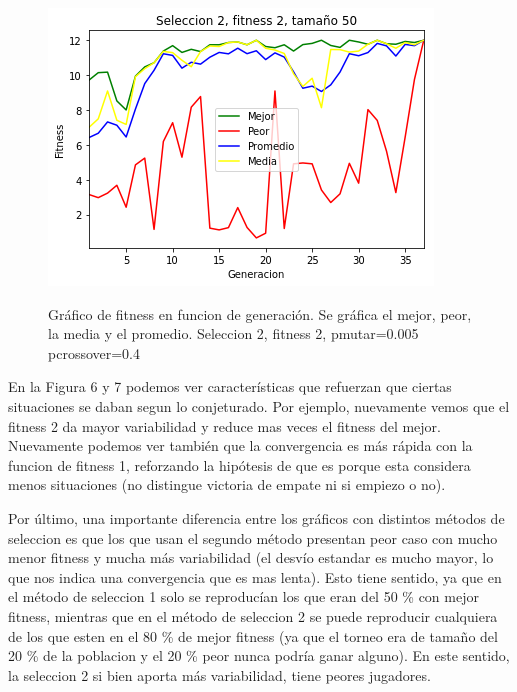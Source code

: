 \documentclass[A4paper,oneside,fleqn,11pt]{article}
\theoremstyle{definition}
\begin{document}
\begin{figure}[H]
	\captionsetup[subfigure]{position=b}
	\centering
		{\includegraphics[width=0.3\linewidth]{s2f2t50.png}}
	\caption{Gráfico de fitness en funcion de generación. Se gráfica el mejor, peor, la media y el promedio. Seleccion 2, fitness 2, pmutar=0.005 pcrossover=0.4}
\end{figure}

En la Figura 6 y 7 podemos ver características que refuerzan que ciertas situaciones se daban segun lo conjeturado. Por ejemplo, nuevamente vemos que el fitness 2 da mayor variabilidad y reduce mas veces el fitness del mejor. Nuevamente podemos ver también que la convergencia es más rápida con la funcion de fitness 1, reforzando la hipótesis de que es porque esta considera menos situaciones (no distingue victoria de empate ni si empiezo o no).

Por último, una importante diferencia entre los gráficos con distintos métodos de seleccion es que los que usan el segundo método presentan peor caso con mucho menor fitness y mucha más variabilidad (el desvío estandar es mucho mayor, lo que nos indica una convergencia que es mas lenta). Esto tiene sentido, ya que en el método de seleccion 1 solo se reproducían los que eran del 50 \% con mejor fitness, mientras que en el método de seleccion 2 se puede reproducir cualquiera de los que esten en el 80  \% de mejor fitness (ya que el torneo era de tamaño del 20  \% de la poblacion y el 20  \% peor nunca podría ganar alguno). En este sentido, la seleccion 2 si bien aporta más variabilidad, tiene peores jugadores.
\end{document}
